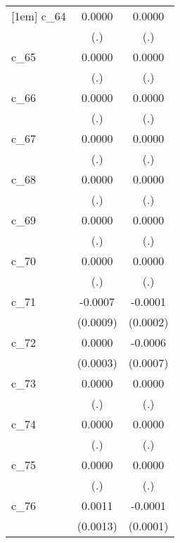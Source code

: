 {\begin{tabular}{l*{2}{c}}
[1em]
c\_64        &      0.0000        &      0.0000        \\
            &         (.)        &         (.)        \\
[1em]
c\_65        &      0.0000        &      0.0000        \\
            &         (.)        &         (.)        \\
[1em]
c\_66        &      0.0000        &      0.0000        \\
            &         (.)        &         (.)        \\
[1em]
c\_67        &      0.0000        &      0.0000        \\
            &         (.)        &         (.)        \\
[1em]
c\_68        &      0.0000        &      0.0000        \\
            &         (.)        &         (.)        \\
[1em]
c\_69        &      0.0000        &      0.0000        \\
            &         (.)        &         (.)        \\
[1em]
c\_70        &      0.0000        &      0.0000        \\
            &         (.)        &         (.)        \\
[1em]
c\_71        &     -0.0007        &     -0.0001        \\
            &    (0.0009)        &    (0.0002)        \\
[1em]
c\_72        &      0.0000        &     -0.0006        \\
            &    (0.0003)        &    (0.0007)        \\
[1em]
c\_73        &      0.0000        &      0.0000        \\
            &         (.)        &         (.)        \\
[1em]
c\_74        &      0.0000        &      0.0000        \\
            &         (.)        &         (.)        \\
[1em]
c\_75        &      0.0000        &      0.0000        \\
            &         (.)        &         (.)        \\
[1em]
c\_76        &      0.0011        &     -0.0001        \\
            &    (0.0013)        &    (0.0001)        \\

\end{tabular}}
